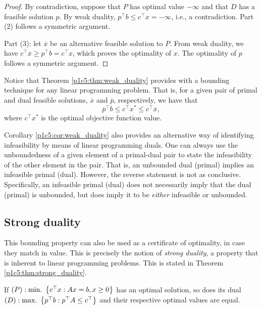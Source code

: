 \begin{proof} 
	By contradiction, suppose that $P$ has optimal value $-\infty$ and that $D$ has a feasible solution $p$. By weak duality, $p^\top b \leq c^\top x = -\infty$, i.e., a contradiction. Part (2) follows a symmetric argument.
	
	Part (3): let $\overline{x}$ be an alternative feasible solution to $P$. From weak duality, we have $c^\top \overline{x} \geq p^\top b = c^\top x$, which proves the optimality of $x$. The optimality of $p$ follows a symmetric argument.
\end{proof}

Notice that Theorem \ref{p1c5:thm:weak_duality} provides with a bounding technique for any linear programming problem. That is, for a given pair of primal and dual feasible solutions, $\overline{x}$ and $\overline{p}$, respectively, we have that 
%
\begin{equation*}
	 \overline{p}^\top b \le c^\top x^* \le c^\top \overline{x},
\end{equation*}
%
where $c^\top x^*$ is the optimal objective function value.

Corollary \ref{p1c5:cor:weak_duality} also provides an alternative way of identifying infeasibility by means of linear programming duals. One can always use the unboundedness of a given element of a primal-dual pair to state the infeasibility of the other element in the pair. That is, an unbounded dual (primal) implies an infeasible primal (dual). However, the reverse statement is not as conclusive. Specifically, an infeasible primal (dual) does not necessarily imply that the dual (primal) is unbounded, but does imply it to be \emph{either} infeasible or unbounded.   


\subsection{Strong duality}

This bounding property can also be used as a certificate of optimality, in case they match in value. This is precisely the notion of \emph{strong duality}, a property that is inherent to linear programming problems. This is stated in Theorem \ref{p1c5:thm:strong_duality}.

\begin{theorem}\label{p1c5:thm:strong_duality}
	If $(P) : \mathop{\text{min.~}}\left\{ c^\top x : Ax = b, x \geq 0 \right \}$ has an optimal solution, so does its dual $(D) : \mathop{\text{max.~}}\left\{ p^\top b : p^\top A \leq c^\top \right \}$ and their respective optimal values are equal.
\end{theorem}

